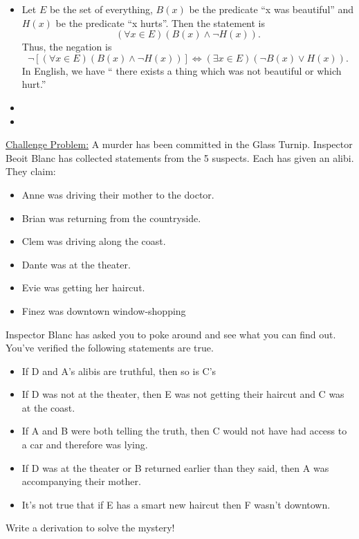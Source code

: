 \documentclass{article}
\theoremstyle{definition}
\begin{document}
	\vspace{0.25cm}
	\begin{itemize}
		\item[(1)] Let $E$ be the set of everything, $B(x)$ be the predicate ``x was beautiful'' and $H(x)$ be the predicate ``x hurts''. Then the statement is $$(\forall x\in E)(B(x)\wedge\neg H(x)).$$  Thus, the negation is $$\neg[(\forall x\in E)(B(x)\wedge\neg H(x))]\Leftrightarrow (\exists x\in E)(\neg B(x) \vee H(x)).$$  In English, we have `` there exists a thing which was not beautiful or which hurt.''
		\item[(2)]
		\item[(3)]
	\end{itemize}

	\vspace{.5cm}

	\noindent \underline{Challenge Problem:}
	A murder has been committed in the Glass Turnip. Inspector Beoit Blanc has collected statements from the 5 suspects. Each has given an alibi. They claim:
	\begin{itemize}
		\item[] Anne was driving their mother to the doctor.
		\item[] Brian was returning from the countryside.
		\item[] Clem was driving along the coast.
		\item[] Dante was at the theater.
		\item[] Evie was getting her haircut.
		\item[] Finez was downtown window-shopping
	\end{itemize}

	Inspector Blanc has asked you to poke around and see what you can find out. You’ve verified the following statements are true.
	\begin{itemize}
		\item If D and A’s alibis are truthful, then so is C’s
		\item If D was not at the theater, then E was not getting their haircut and C was at the coast.
		\item If A and B were both telling the truth, then C would not have had access to a car and therefore was lying.
		\item If D was at the theater or B returned earlier than they said, then A was accompanying their mother.
		\item It’s not true that if E has a smart new haircut then F wasn’t downtown.
	\end{itemize}
	Write a derivation to solve the mystery!
\end{document}
